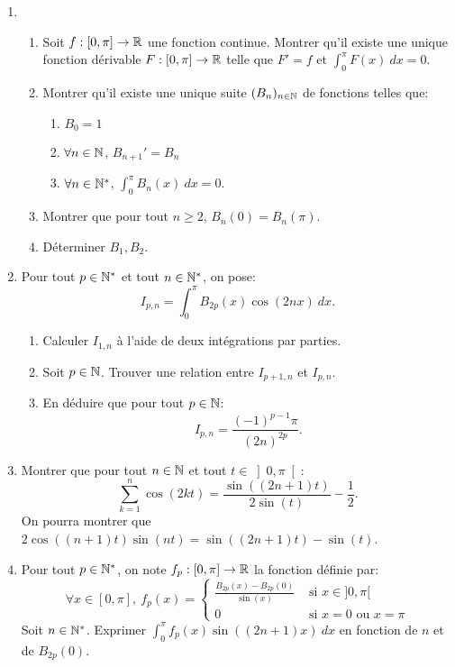 \begin{enumerate}
 \item  \begin{enumerate}
            \item  Soit $f:[0, \pi] \to \mathbb{R}$ une fonction continue. Montrer qu'il existe une unique fonction dérivable $F:[0, \pi]\to \mathbb{R}$ telle que $F' = f$ et $\displaystyle{\int_{0}^{\pi}F(x)\ dx = 0}$.
            \item  Montrer qu'il existe une unique suite $(B_{n})_{n\in \mathbb{N}}$  de fonctions telles que:
            \begin{enumerate}
             \item $B_{0} = 1$
             \item $\forall n\in \mathbb{N}$, $B_{n+1}' = B_{n}$
             \item $\forall n\in \mathbb{N}^{*}$, $\displaystyle{\int_{0}^{\pi}B_{n}(x)\ dx= 0}$. 
            \end{enumerate}
            \item  Montrer que pour tout $n\geq 2$, $B_{n}(0) = B_{n}(\pi)$.
            \item  Déterminer $B_{1},B_{2}$.
           \end{enumerate}

\item  Pour tout $p\in \mathbb{N}^*$ et tout $n\in \mathbb{N}^{*}$, on pose:
\[ 
I_{p,n} = \int_{0}^{\pi}B_{2p}(x)\cos(2nx)\ dx.
\]
\begin{enumerate}
 \item  Calculer $I_{1,n}$ à l'aide de deux intégrations par parties.
 \item  Soit $p\in \mathbb{N}$. Trouver une relation entre $I_{p+1,n}$ et $I_{p,n}$.
 \item  En déduire que pour tout $p\in \mathbb{N}$:
 \[ 
 I_{p,n} = \frac{(-1)^{p-1}\pi}{(2n)^{2p}}.
 \]
\end{enumerate}

\item  Montrer que pour tout $n\in \mathbb{N}$ et tout $t\in \left] 0, \pi\right[ $:
\[ 
\sum_{k=1}^{n}\cos(2kt) = \frac{\sin ((2n+1)t)}{2\sin (t)} - \frac{1}{2}.
\]
On pourra montrer que $2\cos((n+1)t) \sin(nt) = \sin((2n+1)t) - \sin(t)$. 
                                       
\item Pour tout $p\in \mathbb{N}^{*}$, on note $f_{p}:[0, \pi] \to  \mathbb{R}$ la fonction définie par:
\[
\forall x\in [0, \pi],\ f_{p}(x) = \left \{ \begin{array}{ll}
                                                \frac{B_{2p}(x)-B_{2p}(0)}{\sin (x)} & \text{ si } x\in ]0,\pi[\\
                                                0 & \text{ si } x = 0 \text{ ou } x = \pi
                                               \end{array}
                                       \right. 
\]
Soit $n\in \mathbb{N}^{*}$. Exprimer $\displaystyle{\int_{0}^{\pi}f_{p}(x)\sin ((2n+1)x)\ dx}$ en fonction de $n$ et de $B_{2p}(0)$.  


\end{enumerate}
